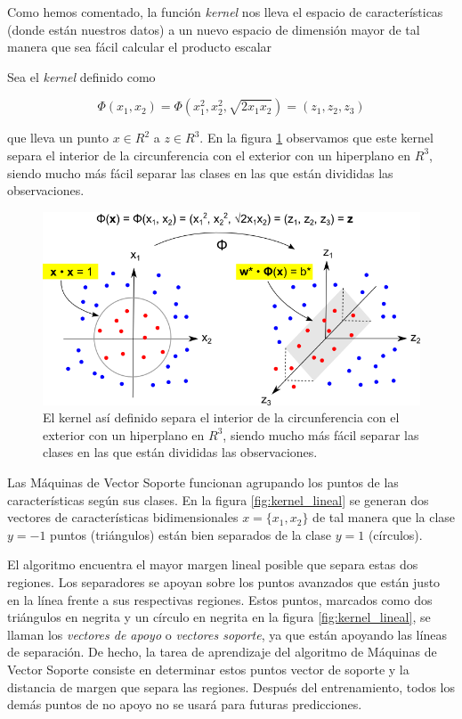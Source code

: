 \documentclass[12pt,spanish,a4paper]{article}
\numberwithin{equation}{section}
\begin{document}
Como hemos comentado, la función \emph{kernel} nos lleva el espacio de
características (donde están nuestros datos) a un nuevo espacio de
dimensión mayor de tal manera que sea fácil calcular el producto escalar

Sea el \emph{kernel} definido como

\begin{equation}
\Phi (x_1, x_2) = \Phi(x_1^2, x_2^2, \sqrt{2 x_1 x_2} ) = (z_1, z_2, z_3)
\end{equation}

que lleva un punto \(x \in R^2\) a \(z \in R^3\). En la figura
\ref{fig:kernel_trick} observamos que este kernel separa el interior de
la circunferencia con el exterior con un hiperplano en \(R^3\), siendo
mucho más fácil separar las clases en las que están divididas las
observaciones.

\begin{figure}[h]
\begin{center}
\includegraphics[width=0.90\linewidth]{./figures/kernel-trick.png}
\caption{El kernel así definido separa el interior de la circunferencia con el exterior con un hiperplano en $R^3$, siendo mucho más fácil separar las clases en las que están divididas las observaciones.}
\label{fig:kernel_trick}
\end{center}
\end{figure}

\clearpage

Las Máquinas de Vector Soporte funcionan agrupando los puntos de las
características según sus clases. En la figura \ref{fig:kernel_lineal}
se generan dos vectores de características bidimensionales
\(x = \{x_1, x_2\}\) de tal manera que la clase \(y = -1\) puntos
(triángulos) están bien separados de la clase \(y = 1\) (círculos).

El algoritmo encuentra el mayor margen lineal posible que separa estas
dos regiones. Los separadores se apoyan sobre los puntos avanzados que
están justo en la línea frente a sus respectivas regiones. Estos puntos,
marcados como dos triángulos en negrita y un círculo en negrita en la
figura \ref{fig:kernel_lineal}, se llaman los \emph{vectores de apoyo} o
\emph{vectores soporte}, ya que están apoyando las líneas de separación.
De hecho, la tarea de aprendizaje del algoritmo de Máquinas de Vector
Soporte consiste en determinar estos puntos vector de soporte y la
distancia de margen que separa las regiones. Después del entrenamiento,
todos los demás puntos de no apoyo no se usará para futuras
predicciones.
\end{document}
